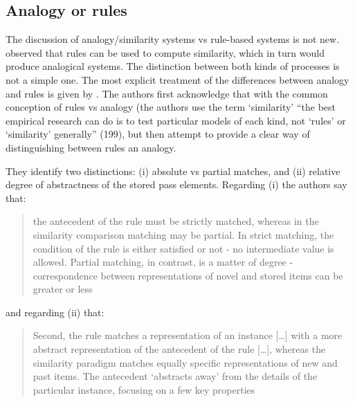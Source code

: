 \subsection{Analogy or rules}


The discussion of analogy/similarity systems vs rule-based systems is not new. \textcite{Nosofsky.1989} observed that rules can be used to compute similarity, which in turn would produce analogical systems. The distinction between both kinds of processes is not a simple one. The most explicit treatment of the differences between analogy and rules is given by \textcite{Hahn.1998}. The authors first acknowledge that with the common conception of rules vs analogy (the authors use the term `similarity' ``the best empirical research can do is to test particular models of each kind, not `rules' or `similarity' generally'' (199), but then attempt to provide a clear way of distinguishing between rules an analogy.

They identify two distinctions: (i) absolute vs partial matches, and (ii) relative degree of abstractness of the stored pass elements. Regarding (i) the authors say that:

\begin{quotation}
the antecedent of the rule must be strictly matched, whereas in the similarity comparison matching may be partial. In strict matching, the condition of the rule is either  satisfied  or  not  - no  intermediate  value  is  allowed.  Partial  matching,  in contrast, is a matter of degree - correspondence between representations of novel and  stored  items  can  be  greater  or less \autocite[202]{Hahn.1998}
\end{quotation}

and regarding (ii) that:

\begin{quotation}
  Second,  the  rule  matches  a  representation  of  an  instance [\dots] with a more abstract representation of the antecedent of the rule [\dots], whereas the similarity paradigm matches equally specific representations of new and past items. The antecedent ‘abstracts away’ from the details of the particular instance, focusing on a few key properties \autocite[202]{Hahn.1998}
\end{quotation}

